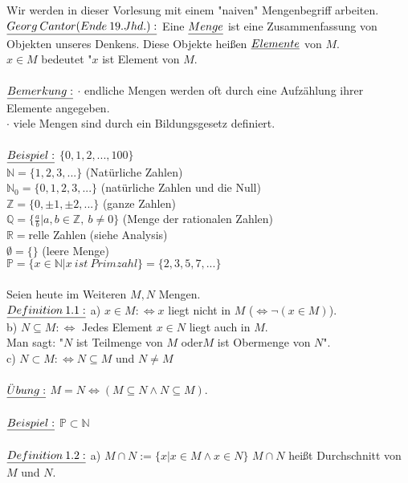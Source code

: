 \documentclass[fleqn, a4paper, 11pt]{article}
\begin{document}
Wir werden in dieser Vorlesung mit einem "naiven" Mengenbegriff arbeiten.\\
$\uline{Georg\:Cantor(Ende\:19.Jhd.):}$ Eine $\uline{Menge}$ ist eine Zusammenfassung von Objekten unseres Denkens. Diese Objekte hei\ss{}en $\uline{Elemente}$ von $M$.\\
$x\in M$ bedeutet "$x$ ist Element von $M$.\\
\\
$\uline{Bemerkung:}$ $\cdot$ endliche Mengen werden oft durch eine Aufz\"ahlung ihrer Elemente angegeben.\\
$\cdot$ viele Mengen sind durch ein Bildungsgesetz definiert.\\
\\
$\uline{Beispiel:}$ $\{0,1,2,...,100\}$\\
$\mathbb{N}=\{1,2,3,...\}$ (Nat\"urliche Zahlen)\\
$\mathbb{N}_{0}=\{0,1,2,3,...\}$ (nat\"urliche Zahlen und die Null)\\
$\mathbb{Z}=\{0,\pm 1,\pm 2,...\}$ (ganze Zahlen)\\
$\mathbb{Q}=\{\tfrac{a}{b} |a,b\in\mathbb{Z},\:b\neq0\}$ (Menge der rationalen Zahlen)\\
$\mathbb{R}=$relle Zahlen (siehe Analysis)\\
$\emptyset=\{\}$ (leere Menge)\\
$\mathbb{P}=\{x\in\mathbb{N} |x\:ist\:Primzahl\}=\{2,3,5,7,...\}$\\
\\
Seien heute im Weiteren $M,N$ Mengen.\\
$\uline{Definition\:1.1:}$ a) $x\in M:\Leftrightarrow x$ liegt nicht in $M$ ($\Leftrightarrow \neg(x\in M)$).\\
b) $N\subseteq M:\Leftrightarrow$ Jedes Element $x\in N$ liegt auch in $M$.\\
Man sagt: "$N$ ist Teilmenge von $M$ \dq oder\dq $M$ ist Obermenge von $N$".\\
c) $N\subset M:\Leftrightarrow N\subseteq M$ und $N\neq M$\\
\\
$\uline{\ddot{U}bung:}$ $M=N\Leftrightarrow(M\subseteq N\wedge N\subseteq M)$.\\
\\
$\uline{Beispiel:}$ $\mathbb{P}\subset\mathbb{N}$\\
\\
$\uline{Definition\:1.2:}$ a) $M\cap N:=\{x|x\in M\wedge x\in N\}$ $M\cap N$ hei\ss{}t Durchschnitt von $M$ und $N$.\\
\end{document}
